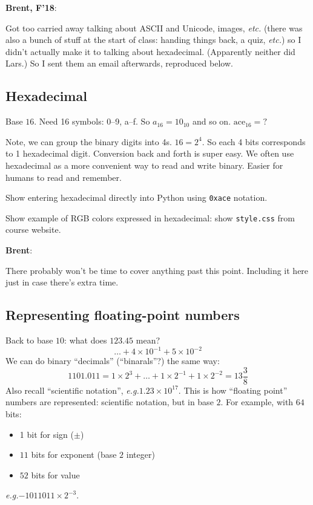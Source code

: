 \documentclass{article}
\newcommand{\eg}{\emph{e.g.}\xspace}
\newenvironment{reflect}[1]
{
  \noindent
  \begin{lrbox}{\reflectbox}
    \begin{minipage}[t]{\textwidth}
      \textbf{#1}:
}{
    \end{minipage}
  \end{lrbox}
  \fbox{\usebox{\reflectbox}}
}
\begin{document}
\begin{reflect}{Brent, F'18}
  Got too carried away talking about ASCII and Unicode, images,
  \emph{etc.} (there was also a bunch of stuff at the start of class:
  handing things back, a quiz, \emph{etc.}) so I didn't actually make
  it to talking about hexadecimal.  (Apparently neither did Lars.)  So
  I sent them an email afterwards, reproduced below.
\end{reflect}

\subsection*{Hexadecimal}

Base $16$.  Need 16 symbols: 0--9, a--f. So $a_{16} = 10_{10}$ and so
on. $\mbox{ace}_{16} = ?$

Note, we can group the binary digits into 4s.  $16 = 2^4$.  So each 4
bits corresponds to 1 hexadecimal digit.  Conversion back and forth is
super easy.  We often use hexadecimal as a more convenient way to read
and write binary.  Easier for humans to read and remember.

Show entering hexadecimal directly into Python using \verb|0xace|
notation.

Show example of RGB colors expressed in hexadecimal: show
\verb|style.css| from course website.

\begin{reflect}{Brent}
  There probably won't be time to cover anything past this point.
  Including it here just in case there's extra time.
\end{reflect}

\subsection*{Representing floating-point numbers}

Back to base $10$: what does $123.45$ mean?
\[ \dots + 4 \times 10^{-1} + 5 \times 10^{-2} \]
We can do binary ``decimals'' (``binarals''?) the same way: \[
1101.011 = 1 \times 2^3 + \dots + 1 \times 2^{-1} + 1 \times 2^{-2} =
13 \frac{3}{8} \]  Also recall ``scientific notation'', \eg $1.23
\times 10^{17}$.  This is how ``floating point'' numbers are
represented: scientific notation, but in base $2$.  For example, with
$64$ bits:
\begin{itemize}
\item 1 bit for sign ($\pm$)
\item $11$ bits for exponent (base $2$ integer)
\item $52$ bits for value
\end{itemize}
\eg $-1011011 \times 2^{-3}$.
\end{document}
